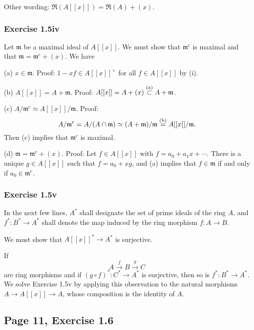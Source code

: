 \documentclass[parskip=half,fontsize=12pt]{scrartcl}%
\newcommand{\oo}{\operatorname}\newcommand{\ooo}{\operatorname*}
\newcommand{\mf}{\mathfrak}
\newcommand{\mmm}{\mf m}
\begin{document}
Other wording: $\mf R(A[[x]])=\mf R(A)+(x)$.

\subsubsection{Exercise 1.5iv}%

Let $\mmm$ be a maximal ideal of $A[[x]]$. We must show that $\mmm^{\oo c}$ is maximal and that $\mmm=\mmm^{\oo c}+(x)$. We have 

(a) $x\in\mmm$. Proof: $1-xf\in A[[x]]^\times$ for all $f\in A[[x]]$ by (i).

(b) $A[[x]]=A+\mmm$. Proof: $A[[x]]=A+(x)\overset{(\text a)}\subset A+\mmm$.

(c) $A/\mmm^{\oo c}\simeq A[[x]]/\mmm$. Proof: 
$$
A/\mmm^{\oo c}=A/(A\cap\mmm)\simeq(A+\mmm)/\mmm\overset{(\text b)}=A[[x]]/\mmm.
$$ 
Then (c) implies that $\mmm^{\oo c}$ is maximal.

(d) $\mmm=\mmm^{\oo c}+(x)$. Proof: Let $f\in A[[x]]$ with $f=a_0+a_1x+\cdots$. There is a unique $g\in A[[x]]$ such that $f=a_0+xg$, and (a) implies that $f\in\mmm$ if and only if $a_0\in\mmm^{\oo c}$. %

\subsubsection{Exercise 1.5v}%

In the next few lines, $A^*$ shall designate the set of prime ideals of the ring $A$, and $f^*:B^*\to A^*$ shall denote the map induced by the ring morphism $f:A\to B$. 

We must show that $A[[x]]^*\to A^*$ is surjective.

If 
$$
A\xrightarrow fB\xrightarrow gC
$$ 
are ring morphisms and if $(g\circ f)^*:C^*\to A^*$ is surjective, then so is $f^*:B^*\to A^*$. We solve Exercise 1.5v by applying this observation to the natural morphisms $A\to A[[x]]\to A$, whose composition is the identity of $A$. 

\subsection{Page 11, Exercise 1.6}%
\end{document}
